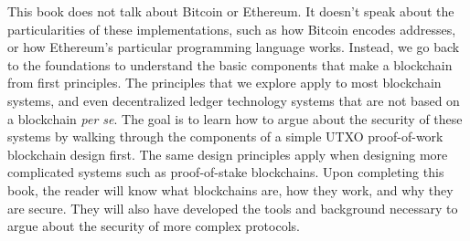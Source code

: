 This book does not talk about Bitcoin or Ethereum. It doesn't speak
about the particularities of these implementations, such as how Bitcoin
encodes addresses, or how Ethereum's particular programming language works.
Instead, we go back to the foundations to understand the basic components
that make a blockchain from first principles. The principles that we explore
apply to most blockchain systems, and even decentralized ledger technology
systems that are not based on a blockchain \emph{per se}. The goal is to learn
how to argue about the security of these systems by walking through the
components of a simple UTXO proof-of-work blockchain design first. The
same design principles apply when designing more complicated systems such
as proof-of-stake blockchains. Upon completing this book, the reader will
know what blockchains are, how they work, and why they are secure. They
will also have developed the tools and background necessary to argue about
the security of more complex protocols.
